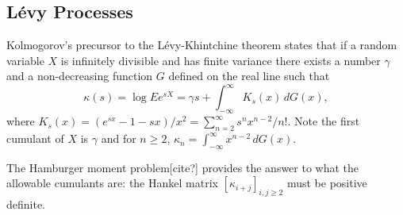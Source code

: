 \documentclass[11pt]{article}
\newcommand{\Var}{\mathop{\rm{Var}}}
\theoremstyle{definition}
\begin{document}

%



\subsection{L\'evy Processes}



Kolmogorov's precursor to the L\'evy-Khintchine theorem\cite{Kol1992}
states that if a random variable \(X\) is infinitely divisible
and has finite variance
there exists a number \(\gamma\) and a non-decreasing function
\(G\) defined on the real line such that
\[
\kappa(s) = \log Ee^{sX} = \gamma s + \int_{-\infty}^\infty K_s(x)\,dG(x),
\]
where \(K_s(x) = (e^{sx} - 1 - sx)/x^2 = \sum_{n=2}^\infty s^nx^{n-2}/n!\).
Note the first cumulant of \(X\) is \(\gamma\) and for \(n\ge 2\),
\(\kappa_n = \int_{-\infty}^\infty x^{n-2}\,dG(x)\).

The Hamburger moment problem[cite?] provides the answer to
what the allowable cumulants are: the Hankel matrix
\([\kappa_{i+j}]_{i,j\ge 2}\) must be positive definite.
\end{document}
